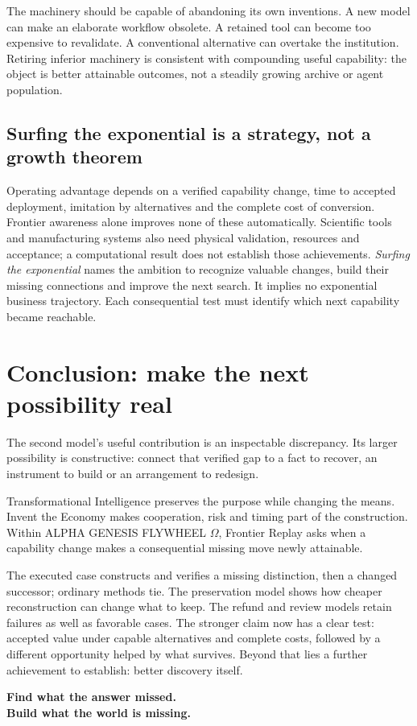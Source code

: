 The machinery should be capable of abandoning its own inventions. A new model can make an elaborate workflow obsolete. A retained tool can become too expensive to revalidate. A conventional alternative can overtake the institution. Retiring inferior machinery is consistent with compounding useful capability: the object is better attainable outcomes, not a steadily growing archive or agent population.

\subsection{Surfing the exponential is a strategy, not a growth theorem}
Operating advantage depends on a verified capability change, time to accepted deployment, imitation by alternatives and the complete cost of conversion. Frontier awareness alone improves none of these automatically. Scientific tools and manufacturing systems also need physical validation, resources and acceptance; a computational result does not establish those achievements. \emph{Surfing the exponential} names the ambition to recognize valuable changes, build their missing connections and improve the next search. It implies no exponential business trajectory. Each consequential test must identify which next capability became reachable.

\section{Conclusion: make the next possibility real}
The second model's useful contribution is an inspectable discrepancy. Its larger possibility is constructive: connect that verified gap to a fact to recover, an instrument to build or an arrangement to redesign.

Transformational Intelligence preserves the purpose while changing the means. Invent the Economy makes cooperation, risk and timing part of the construction. Within ALPHA GENESIS FLYWHEEL $\Omega$, Frontier Replay asks when a capability change makes a consequential missing move newly attainable.

The executed case constructs and verifies a missing distinction, then a changed successor; ordinary methods tie. The preservation model shows how cheaper reconstruction can change what to keep. The refund and review models retain failures as well as favorable cases. The stronger claim now has a clear test: accepted value under capable alternatives and complete costs, followed by a different opportunity helped by what survives. Beyond that lies a further achievement to establish: better discovery itself.
\begin{thesisbox}
\large\bfseries Find what the answer missed.\\Build what the world is missing.
\end{thesisbox}
